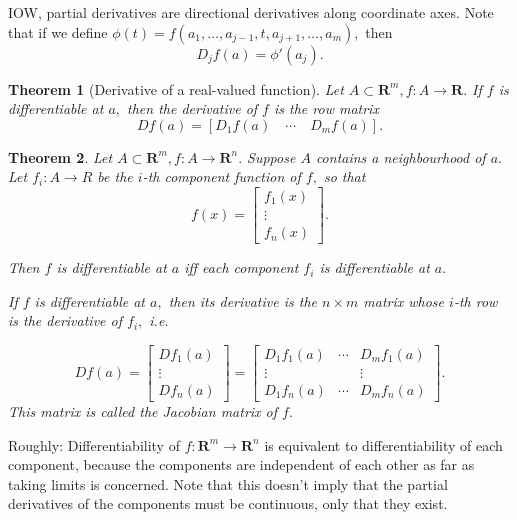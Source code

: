 \documentclass[12pt]{article}
\let\oldBeginItemize=\itemize
\let\oldEndItemize=\enditemize
\renewenvironment{itemize}{
\oldBeginItemize
  \setlength{\itemsep}{0pt}
  \setlength{\parskip}{0pt}
  \setlength{\parsep}{0pt}
}{\oldEndItemize}
\theoremstyle{plain}
\newtheorem{theorem}{Theorem}
\theoremstyle{definition}
\theoremstyle{remark}
\newcommand{\bR}{\mathbf R}
\newcommand{\0}{\varnothing}
\newcommand{\<}{\langle}
\renewcommand{\>}{\rangle}
\begin{document}
IOW, partial derivatives are directional derivatives along coordinate axes. Note
that if we define \( \phi(t) = f(a_1,\ldots, a_{j-1}, t, a_{j+1},\ldots,a_m), \)
then
\[
D_j f(a) = \phi'(a_j).
\]

\begin{theorem}[Derivative of a real-valued function]
  Let \( A \subset \bR^m, f: A \longrightarrow \bR. \) If \( f \) is differentiable at \( a, \) then the derivative of \( f \) is the row matrix
\[
Df(a) = [D_1 f(a) \quad \cdots \quad D_m f(a)].
\]
\end{theorem}

\begin{theorem}
Let \( A \subset \bR^m, f: A \longrightarrow \bR^n. \) Suppose \( A \) contains a neighbourhood of \( a. \) Let \( f_i: A \longrightarrow R \) be the \( i \)-th component function of \( f, \) so that
\[
f(x) = \begin{bmatrix}
f_1 (x) \\
\vdots \\
f_n (x)
\end{bmatrix}.
\]
\begin{itemize}
\item Then \( f \) is differentiable at \( a \) iff each component \( f_i \) is differentiable at \( a. \)

\item If \( f \) is differentiable at \( a, \) then its derivative is the \( n \times m \) matrix whose \( i \)-th row is the derivative of \( f_i,  \) i.e.

\footnotesize
\[
D f(a) = \begin{bmatrix}
D f_1 (a) \\
\vdots \\
D f_n (a)
\end{bmatrix} = \begin{bmatrix}
D_1 f_1 (a) & \cdots & D_m f_1 (a) \\
\vdots & & \vdots \\
D_1 f_n (a) & \cdots & D_m f_n (a)
\end{bmatrix}.
\]
\normalsize
  This matrix is called the Jacobian matrix of \( f. \)
\end{itemize}
\end{theorem}

Roughly: Differentiability of \( f: \bR^m \longrightarrow \bR^n \) is equivalent
to differentiability of each component, because the components are independent
of each other as far as taking limits is concerned. Note that this doesn't imply
that the partial derivatives of the components must be continuous, only that
they exist.
\end{document}

